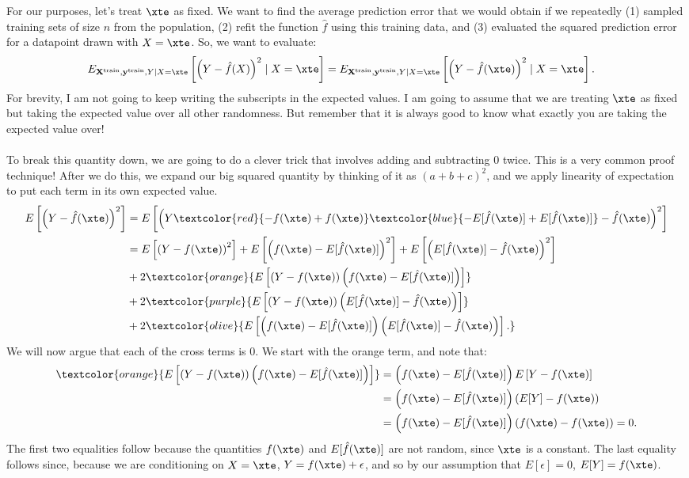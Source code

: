 {For our purposes, let's treat $\xte$ as fixed. We want to find the average prediction error that we would obtain if we repeatedly (1) sampled training sets of size $n$ from the population, (2) refit the function $\hat{f}$ using this training data, and (3) evaluated the squared prediction error for a datapoint drawn with $X = \xte$. So, we want to evaluate: 
\begin{align*}
	E_{\bold{X}^\mathrm{train}, \bold{y}^\mathrm{train},Y \mid X=\xte}\left[\left(Y - \hat{f}(X)\right)^2 \mid X=\xte \right] &= 	E_{\bold{X}^\mathrm{train}, \bold{y}^\mathrm{train},Y \mid X=\xte}\left[\left(Y - \hat{f}(\xte)\right)^2 \mid X=\xte \right]. 
\end{align*}
For brevity, I am not going to keep writing the subscripts in the expected values. I am going to assume that we are treating $\xte$ as fixed but taking the expected value over all other randomness. But remember that it is always good to know what exactly you are taking the expected value over! \\
\\
To break this quantity down, we are going to do a clever trick that involves adding and subtracting $0$ twice. This is a very common proof technique! After we do this, we expand our big squared quantity by thinking of it as $(a+b+c)^2$, and we apply linearity of expectation to put each term in its own expected value.  
\begin{align*}
  E\left[\left(Y - \hat{f}(\xte)\right)^2 \right] &=   E\left[\left(Y  \textcolor{red}{-f(\xte) + f(\xte)} \textcolor{blue}{-E[\hat{f}(\xte)] + E[\hat{f}(\xte)]} -  \hat{f}(\xte)\right)^2 \right]  \\
  &= E\left[\left(Y -f(\xte)\right)^2\right] + E\left[\left(f(\xte) - E[\hat{f}(\xte)]\right)^2\right] + E\left[\left(E[\hat{f}(\xte)] -  \hat{f}(\xte)\right)^2\right] \\
  & + 2 \textcolor{orange}{E\left[\left(Y -f(\xte)\right) \left(f(\xte) - E[\hat{f}(\xte)]\right)\right]}\\
  & + 2 \textcolor{purple}{E\left[\left(Y -f(\xte)\right) \left(E[\hat{f}(\xte)] -  \hat{f}(\xte)\right)\right]} \\
  & + 2  \textcolor{olive}{E\left[\left(f(\xte) - E[\hat{f}(\xte)]\right) \left(E[\hat{f}(\xte)] -  \hat{f}(\xte)\right)\right].  }
\end{align*}
We will now argue that each of the cross terms is $0$. We start with the orange term, and note that: 
\begin{align*}
\textcolor{orange}{E\left[\left(Y -f(\xte)\right) \left(f(\xte) - E[\hat{f}(\xte)]\right)\right]} &= \left(f(\xte) - E[\hat{f}(\xte)]\right) E\left[ Y -f(\xte)\right]\\
&= \left(f(\xte) - E[\hat{f}(\xte)]\right) \left( E[Y] -f(\xte)\right)\\
&= 	\left(f(\xte) - E[\hat{f}(\xte)]\right) \left(f(\xte) -f(\xte)\right) = 0. 
\end{align*}
The first two equalities follow because the quantities $f(\xte)$ and $E[\hat{f}(\xte)]$ are not random, since $\xte$ is a constant. The last equality follows since, because we are conditioning on $X = \xte$, $Y = f(\xte) + \epsilon$, and so by our assumption that $E[\epsilon]=0$, $E[Y] =f(\xte)$. 

}
